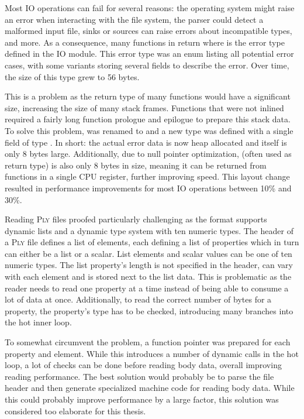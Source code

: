 Most IO operations can fail for several reasons: the operating system might raise an error when interacting with the file system, the parser could detect a malformed input file, sinks or sources can raise errors about incompatible types, and more.
As a consequence, many functions in  return  where  is the error type defined in the IO module.
This error type was an enum listing all potential error cases, with some variants storing several fields to describe the error.
Over time, the size of this type grew to 56 bytes.

This is a problem as the return type of many functions would have a significant size, increasing the size of many stack frames.
Functions that were not inlined required a fairly long function prologue and epilogue to prepare this stack data.
To solve this problem,  was renamed to  and a new type  was defined with a single field of type .
In short: the actual error data is now heap allocated and  itself is only 8 bytes large.
Additionally, due to null pointer optimization,  (often used as return type) is also only 8 bytes in size, meaning it can be returned from functions in a single CPU register, further improving speed.
This layout change resulted in performance improvements for most IO operations between 10\% and 30\%.

Reading \textsc{Ply} files proofed particularly challenging as the format supports dynamic lists and a dynamic type system with ten numeric types.
The header of a \textsc{Ply} file defines a list of elements, each defining a list of properties which in turn can either be a list or a scalar.
List elements and scalar values can be one of ten numeric types.
The list property's length is not specified in the header, can vary with each element and is stored next to the list data.
This is problematic as the reader needs to read one property at a time instead of being able to consume a lot of data at once.
Additionally, to read the correct number of bytes for a property, the property's type has to be checked, introducing many branches into the hot inner loop.

To somewhat circumvent the problem, a function pointer was prepared for each property and element.
While this introduces a number of dynamic calls in the hot loop, a lot of checks can be done before reading body data, overall improving reading performance.
The best solution would probably be to parse the file header and then generate specialized machine code for reading body data.
While this could probably improve performance by a large factor, this solution was considered too elaborate for this thesis.


